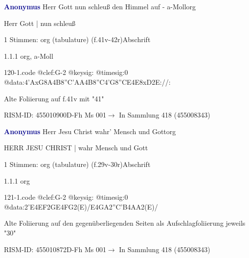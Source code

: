 \documentclass[twocolumn]{book}
\begin{document}
\par \vspace{7pt} \textcolor{darkblue}{\textbf{Anonymus  }}\hfillplus{\textbf{[120]}}\newline Herr Gott nun schleuß den Himmel auf - a-Moll\newline org
\par \begin{itshape}[f.41v, at left:] Herr Gott | nun schleuß\end{itshape} 
\par \textcolor{darkblue}{}  1 Stimmen: org (tabulature)  (f.41v-42r)\newline Abschrift
\par 1.1.1  org, a-Moll  
\begin{filecontents*}{120-1.code}
@clef:G-2
@keysig:
@timesig:0
@data:4'AxG8A4B8''C{'AA}4B8''C4'G8''CE4E8xD2E://:
\end{filecontents*}
\newline
%
\par Alte Foliierung auf f.41v mit "41"
\par RISM-ID: 455010900\newline D-Fh  Ms 001\newline $\rightarrow$ In Sammlung 418 (455008343)
      
\par \vspace{7pt} \textcolor{darkblue}{\textbf{Anonymus  }}\hfillplus{\textbf{[121]}}\newline Herr Jesu Christ wahr' Mensch und Gott\newline org
\par \begin{itshape}[f.29v, at left:] HERR JESU CHRIST | wahr Mensch und Gott\end{itshape} 
\par \textcolor{darkblue}{}  1 Stimmen: org (tabulature)  (f.29v-30r)\newline Abschrift
\par 1.1.1  org  
\begin{filecontents*}{121-1.code}
@clef:G-2
@keysig:
@timesig:0
@data:2'E4EF2GE4FG2(E)/E4GA2''C'B4AA2(E)/
\end{filecontents*}
\newline
%
\par Alte Foliierung auf den gegenüberliegenden Seiten als Aufschlagfoliierung jeweils "30"
\par RISM-ID: 455010872\newline D-Fh  Ms 001\newline $\rightarrow$ In Sammlung 418 (455008343)
      
\end{document}
